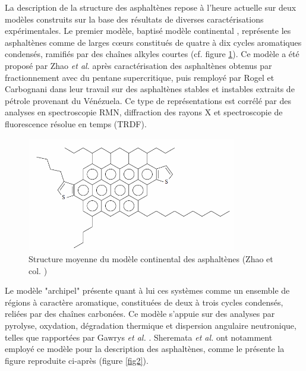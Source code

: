\documentclass[12pt,a4paper]{book}
\begin{document}
La description de la structure des asphaltènes repose à l'heure actuelle sur deux modèles construits sur la base des résultats de diverses caractérisations expérimentales.  
Le premier modèle, baptisé modèle \og continental \fg, représente les asphaltènes comme de larges cœurs constitués de quatre à dix cycles aromatiques condensés, ramifiés par des chaînes alkyles courtes \cite{groenzin2000molecular} (cf. figure \ref{figZ1}). Ce modèle a été proposé par Zhao \textit{et al.} \cite{zhao2001molecular} après caractérisation des asphaltènes obtenus par fractionnement avec du pentane supercritique, puis remployé par Rogel et Carbognani \cite{rogel2003density} dans leur travail sur des asphaltènes stables et instables extraits de pétrole provenant du Vénézuela. 
Ce type de représentations est corrélé par des analyses en spectroscopie RMN, diffraction des rayons X et spectroscopie de fluorescence résolue en temps (TRDF). 



\begin{figure}[h!]
	\centering
	\includegraphics[height=5cm]{../image/Zhao}
	\caption[Structure moyenne du modèle continental des asphaltènes]{Structure moyenne du modèle continental des asphaltènes (Zhao et col. \cite{zhao2001molecular})}
	\label{figZ1}
\end{figure}


Le modèle "archipel" présente quant à lui ces systèmes comme un ensemble de régions à caractère aromatique, constituées de deux à trois cycles condensés, reliées par des chaînes carbonées. Ce modèle s'appuie sur des analyses par pyrolyse, oxydation, dégradation thermique et dispersion angulaire neutronique, telles que rapportées par Gawrys \textit{et al.} \cite{gawrys2003role}. Sheremata \textit{et al.}\cite{sheremata2004quantitative} ont notamment employé ce modèle pour la description des asphaltènes, comme le présente la figure reproduite ci-après (figure \ref{fig2}). 
\end{document}
